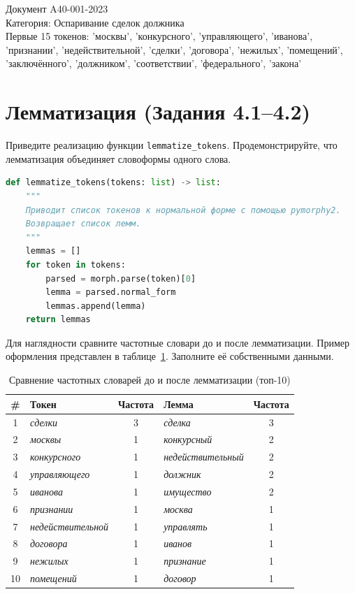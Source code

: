 \documentclass[12pt, a4paper]{report}
\newcommand{\placeholder}[2][Вставьте результат]{%
  \begin{tcolorbox}[placeholderbox, title={#2}]
    #1
  \end{tcolorbox}%
  \vspace{4pt}%
}
\begin{document}
\placeholder[Документ A40-001-2023\\
  Категория: Оспаривание сделок должника\\
  Первые 15 токенов: 'москвы', 'конкурсного', 'управляющего', 'иванова', 'признании', 'недействительной', 'сделки', 'договора', 'нежилых', 'помещений', 'заключённого', 'должником', 'соответствии', 'федерального', 'закона'
]{Пример токенизации}


\section{Лемматизация (Задания 4.1–4.2)}

Приведите реализацию функции \texttt{lemmatize\_tokens}. Продемонстрируйте, что
лемматизация объединяет словоформы одного слова.

\begin{lstlisting}[language=Python, caption={Реализация функции лемматизации}]
  def lemmatize_tokens(tokens: list) -> list:
    """
    Приводит список токенов к нормальной форме с помощью pymorphy2.
    Возвращает список лемм.
    """
    lemmas = []
    for token in tokens:
        parsed = morph.parse(token)[0]
        lemma = parsed.normal_form
        lemmas.append(lemma)
    return lemmas
\end{lstlisting}

Для наглядности сравните частотные словари до и после лемматизации. Пример оформления
представлен в таблице~\ref{tab:lemma_compare}. Заполните её собственными данными.

\begin{table}[h]
  \centering
  \caption{Сравнение частотных словарей до и после лемматизации (топ-10)}
  \label{tab:lemma_compare}
  \begin{tabularx}{0.9\textwidth}{c X c X c}
    \toprule
    \rowcolor{LightBlue}
    \textsf{\textbf{\#}} &
    \textsf{\textbf{Токен}} &
    \textsf{\textbf{Частота}} &
    \textsf{\textbf{Лемма}} &
    \textsf{\textbf{Частота}} \\
    \midrule
    1  & \textit{сделки} & 3 & \textit{сделка} & 3 \\
    2  & \textit{москвы} & 1 & \textit{конкурсный} & 2 \\
    3  & \textit{конкурсного} & 1 & \textit{недействительный} & 2 \\
    4  & \textit{управляющего} & 1 & \textit{должник} & 2 \\
    5  & \textit{иванова} & 1 & \textit{имущество} & 2 \\
    6  & \textit{признании} & 1 & \textit{москва} & 1 \\
    7  & \textit{недействительной} & 1 & \textit{управлять} & 1 \\
    8  & \textit{договора} & 1 & \textit{иванов} & 1 \\
    9  & \textit{нежилых} & 1 & \textit{признание} & 1 \\
    10 & \textit{помещений} & 1 & \textit{договор} & 1 \\
    \bottomrule
  \end{tabularx}
\end{table}
\end{document}
